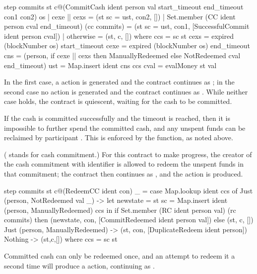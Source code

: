 \documentclass[runningheads]{llncs}
\begin{document}
\begin{haskellcode}
step 
  commits 
  st 
  c@(CommitCash ident person val start_timeout end_timeout con1 con2) 
  os
  | cexe || cexs = (st {sc = ust}, con2, [])
  | Set.member (CC ident person cval end_timeout) (cc commits)
        = (st {sc = ust}, con1, [SuccessfulCommit ident person cval])
  | otherwise = (st, c, [])
  where ccs = sc st
        cexs = expired (blockNumber os) start_timeout
        cexe = expired (blockNumber os) end_timeout
        cns = (person, if cexe || cexs 
                          then ManuallyRedeemed 
                          else NotRedeemed cval end_timeout)
        ust = Map.insert ident cns ccs
        cval = evalMoney st val
\end{haskellcode}
In the first case, a  action is generated and the contract continues as 
; in the second case no action is generated and the contract continues as 
. While neither case holds, the contract is quiescent, waiting for the cash to be committed. 

If the cash is committed successfully and the timeout  is reached, then it is impossible to 
further spend the committed cash, and any unspent funds can be reclaimed by participant .
 This is enforced by the  function, as noted above.

\medskip
\noindent
{} ( stands for cash commitment.) For this contract to make 
progress, the creator of the cash commitment with identifier  is allowed to redeem the unspent 
funds in that commitment; the contract then continues as , and the action 
 is produced. 

\begin{haskellcode}
step commits st c@(RedeemCC ident con) _ =
    case Map.lookup ident ccs of
      Just (person, NotRedeemed val _) ->
        let newstate = 
                st {sc = Map.insert ident (person, ManuallyRedeemed) ccs} in
        if Set.member (RC ident person val) (rc commits)
        then (newstate, con, [CommitRedeemed ident person val])
        else (st, c, [])
      Just (person, ManuallyRedeemed) ->
        (st, con, [DuplicateRedeem ident person])
      Nothing -> (st,c,[])
    where
        ccs = sc st
\end{haskellcode}
Committed cash can only be redeemed once, and an attempt to redeem it a second time will produce a  
 action, continuing as .
\end{document}
